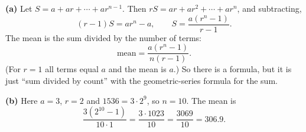 \textbf{(a)} Let $S=a+ar+\cdots+ar^{n-1}$. Then $rS=ar+ar^2+\cdots+ar^n$, and subtracting,
\[(r-1)S=ar^n-a,\qquad S=\dfrac{a(r^n-1)}{r-1}.\]
The mean is the sum divided by the number of terms:
\[\boxed{\text{mean}=\dfrac{a(r^n-1)}{n(r-1)}}.\]
(For $r=1$ all terms equal $a$ and the mean is $a$.) So there is a formula, but it is just ``sum divided by count'' with the geometric-series formula for the sum.

\textbf{(b)} Here $a=3$, $r=2$ and $1536=3\cdot2^9$, so $n=10$. The mean is
\[\dfrac{3(2^{10}-1)}{10\cdot1}=\dfrac{3\cdot1023}{10}=\boxed{\dfrac{3069}{10}=306.9}.\]
